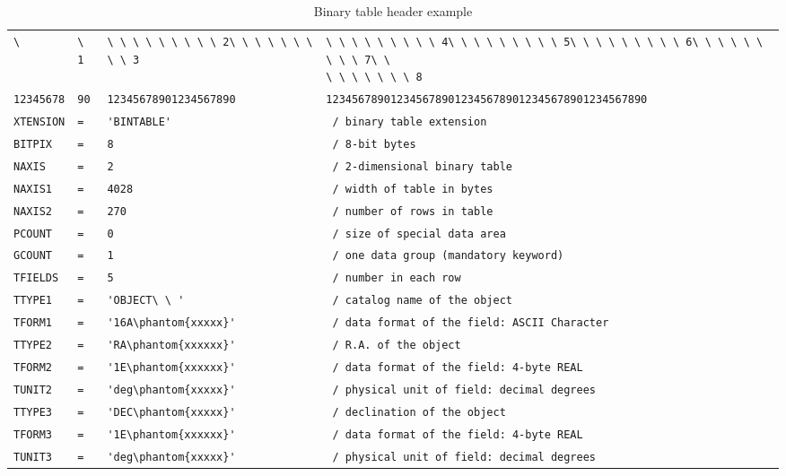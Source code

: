 \newcommand{\V}[1]{\verb*|#1|}
\newcommand{\bthef}[4]{\V{#1}&\V{#2}&\V{#3}&\V{#4}}
\newcommand{\bthes}[3]{\V{#1}&\V{= }&\V{#2}&\V{ / #3}}
\newcommand{\bther}[3]{\V{#1}&\V{= }&\hfill\V{#2}&\V{ / #3}}
\newcommand{\bthec}[1]{\V{COMMENT}&\multicolumn{3}{l|}{\V{ #1}}}
\newcommand{\btheh}[1]{\V{HISTORY}&\multicolumn{3}{l|}{\V{ #1}}}
\newcommand{\bthee}{\V{END}&&&}
\begin{table*}
\begin{center}
\caption[]{Binary table header example}\label{tab_example}
\begin{tabular}{|l@{}l@{}l@{}l|}
\noalign{\smallskip}
\hline
\bthef{\ }{\ 1}{\ \ \ \ \ \ \ \ \ 2\ \ \ \ \ \ \ \ \ 3}
{\ \ \ \ \ \ \ \ \ 4\ \ \ \ \ \ \ \ \ 5\ \ \ \ \ \ \ \ \ 6\ \ \ \ \ \ \ \ \ 7\ \
\ \ \ \ \ \ \ 8}\\
\bthef{12345678}{90}{12345678901234567890}
{12345678901234567890123456789012345678901234567890}\\
\hline\hline
\bthes{XTENSION}{'BINTABLE'}{binary table extension}\\ 
\bther{BITPIX}   {8}{8-bit bytes} \\
\bther{NAXIS}    {2}{2-dimensional binary table} \\
\bther{NAXIS1}{4028}{width of table in bytes} \\
\bther{NAXIS2} {270}{number of rows in table} \\
\bther{PCOUNT}   {0}{size of special data area} \\
\bther{GCOUNT}   {1}{one data group (mandatory keyword)} \\
\bther{TFIELDS}  {5}{number in each row} \\
\bthes{TTYPE1}{'OBJECT\ \ '}{catalog name of the object} \\
\bthes{TFORM1}{'16A\phantom{xxxxx}'}{data format of the field: ASCII Character} \\
\bthes{TTYPE2}{'RA\phantom{xxxxxx}'}{R.A. of the object} \\
\bthes{TFORM2}{'1E\phantom{xxxxxx}'}{data format of the field: 4-byte REAL} \\
\bthes{TUNIT2}{'deg\phantom{xxxxx}'}{physical unit of field: decimal degrees} \\
\bthes{TTYPE3}{'DEC\phantom{xxxxx}'}{declination of the object} \\
\bthes{TFORM3}{'1E\phantom{xxxxxx}'}{data format of the field: 4-byte REAL} \\
\bthes{TUNIT3}{'deg\phantom{xxxxx}'}{physical unit of field: decimal degrees} \\

\end{tabular}
\end{center}
\end{table*}
